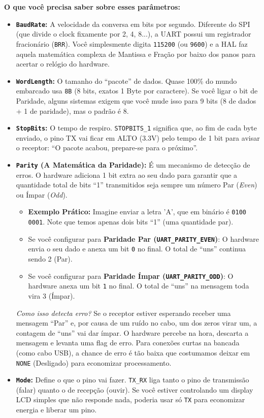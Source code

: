 \documentclass[12pt,a4paper]{article}
\begin{document}
\textbf{O que você precisa saber sobre esses parâmetros:}
\begin{itemize}
    \item \textbf{\texttt{BaudRate}:} A velocidade da conversa em bits por segundo. Diferente do SPI (que divide o clock fixamente por 2, 4, 8...), a UART possui um registrador fracionário (\texttt{BRR}). Você simplesmente digita \texttt{115200} (ou \texttt{9600}) e a HAL faz aquela matemática complexa de Mantissa e Fração por baixo dos panos para acertar o relógio do hardware.
    
    \item \textbf{\texttt{WordLength}:} O tamanho do ``pacote'' de dados. Quase 100\% do mundo embarcado usa \texttt{8B} (8 bits, exatos 1 Byte por caractere). Se você ligar o bit de Paridade, alguns sistemas exigem que você mude isso para 9 bits (8 de dados + 1 de paridade), mas o padrão é 8.
    
    \item \textbf{\texttt{StopBits}:} O tempo de respiro. \texttt{STOPBITS\_1} significa que, ao fim de cada byte enviado, o pino TX vai ficar em ALTO (3.3V) pelo tempo de 1 bit para avisar o receptor: ``O pacote acabou, prepare-se para o próximo''.
    
    \item \textbf{\texttt{Parity} (A Matemática da Paridade):} É um mecanismo de detecção de erros. O hardware adiciona 1 bit extra ao seu dado para garantir que a quantidade total de bits ``1'' transmitidos seja sempre um número Par (\textit{Even}) ou Ímpar (\textit{Odd}).
    \begin{itemize}
        \item \textbf{Exemplo Prático:} Imagine enviar a letra 'A', que em binário é \texttt{0100 0001}. Note que temos apenas dois bits ``1'' (uma quantidade par).
        \item Se você configurar para \textbf{Paridade Par (\texttt{UART\_PARITY\_EVEN})}: O hardware envia o seu dado e anexa um bit \texttt{0} no final. O total de ``uns'' continua sendo 2 (Par).
        \item Se você configurar para \textbf{Paridade Ímpar (\texttt{UART\_PARITY\_ODD})}: O hardware anexa um bit \texttt{1} no final. O total de ``uns'' na mensagem toda vira 3 (Ímpar).
    \end{itemize}
    \textit{Como isso detecta erro?} Se o receptor estiver esperando receber uma mensagem ``Par'' e, por causa de um ruído no cabo, um dos zeros virar um, a contagem de ``uns'' vai dar ímpar. O hardware percebe na hora, descarta a mensagem e levanta uma flag de erro. Para conexões curtas na bancada (como cabo USB), a chance de erro é tão baixa que costumamos deixar em \texttt{NONE} (Desligado) para economizar processamento.    
    \item \textbf{\texttt{Mode}:} Define o que o pino vai fazer. \texttt{TX\_RX} liga tanto o pino de transmissão (falar) quanto o de recepção (ouvir). Se você estiver controlando um display LCD simples que não responde nada, poderia usar só \texttt{TX} para economizar energia e liberar um pino.
    

\end{itemize}
\end{document}
